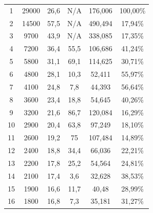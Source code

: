 \begin{longtable}[H]{cccccc}
  1           & 29000                & 26,6          & N/A            & 176,006       & 100,00\%                           \\
  2           & 14500                & 57,5          & N/A            & 490,494       & 17,94\%                            \\
  3           & 9700                 & 43,9          & N/A            & 338,085       & 17,35\%                            \\
  4           & 7200                 & 36,4          & 55,5           & 106,686       & 41,24\%                            \\
  5           & 5800                 & 31,1          & 69,1           & 114,625       & 30,71\%                            \\
  6           & 4800                 & 28,1          & 10,3           & 52,411        & 55,97\%                            \\
  7           & 4100                 & 24,8          & 7,8            & 44,393        & 56,64\%                            \\
  8           & 3600                 & 23,4          & 18,8           & 54,645        & 40,26\%                            \\
  9           & 3200                 & 21,6          & 86,7           & 120,084       & 16,29\%                            \\
  10          & 2900                 & 20,4          & 63,8           & 97,249        & 18,10\%                            \\
  11          & 2600                 & 19,2          & 75             & 107,484       & 14,89\%                            \\
  12          & 2400                 & 18,8          & 34,4           & 66,036        & 22,21\%                            \\
  13          & 2200                 & 17,8          & 25,2           & 54,564        & 24,81\%                            \\
  14          & 2100                 & 17,4          & 3,6            & 32,628        & 38,53\%                            \\
  15          & 1900                 & 16,6          & 11,7           & 40,48         & 28,99\%                            \\
  16          & 1800                 & 16,8          & 7,3            & 35,181        & 31,27\%                            \\

\end{longtable}

